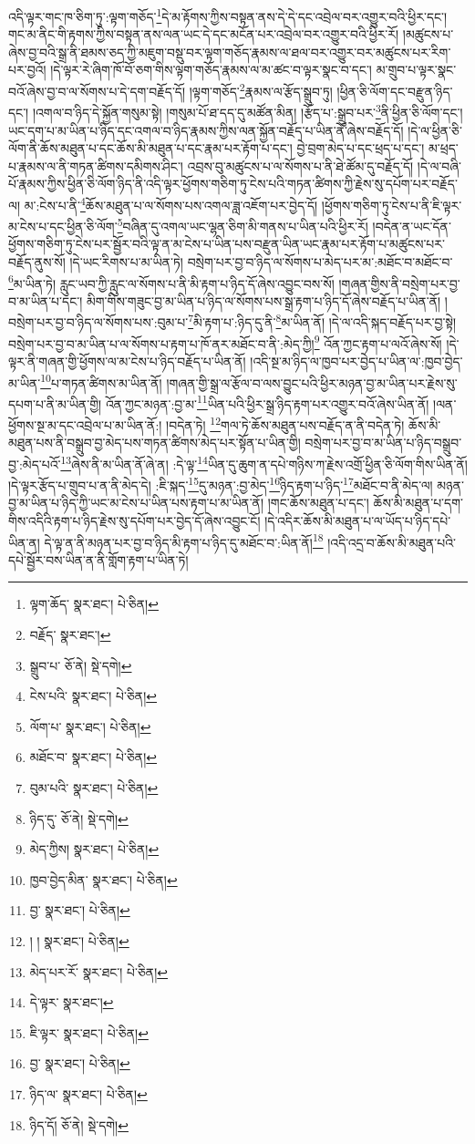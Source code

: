 འདི་ལྟར་གང་ཁ་ཅིག་ཏུ་:ལྟག་གཅོད་\footnote{ལྟག་ཆོད་  སྣར་ཐང་།  པེ་ཅིན། }དེ་མ་རྟོགས་ཀྱིས་བསྟན་ནས་དེ་དེ་དང་འབྲེལ་བར་འགྱུར་བའི་ཕྱིར་དང་། གང་མ་ནིང་གི་རྟགས་ཀྱིས་བསྟན་ནས་ལན་ཡང་དེ་དང་མངོན་པར་འབྲེལ་བར་འགྱུར་བའི་ཕྱིར་རོ། །མཚུངས་པ་ཞེས་བྱ་བའི་སྒྲ་ནི་ཐམས་ཅད་ཀྱི་མཇུག་བསྡུ་བར་ལྟག་གཅོད་རྣམས་ལ་ཐལ་བར་འགྱུར་བར་མཚུངས་པར་རིག་པར་བྱའོ། །དེ་ལྟར་རེ་ཞིག་ཁོ་བོ་ཅག་གིས་ལྟག་གཅོད་རྣམས་ལ་མ་ཚང་བ་ལྟར་སྣང་བ་དང་། མ་གྲུབ་པ་ལྟར་སྣང་བའོ་ཞེས་བྱ་བ་ལ་སོགས་པ་དེ་དག་བརྗོད་དོ། །ལྟག་གཅོད་\footnote{བརྗོད་  སྣར་ཐང་། }རྣམས་ལ་རྩོད་སྒྲུབ་ཏུ། །ཕྱིན་ཅི་ལོག་དང་བརྫུན་ཉིད་དང་། །འགལ་བ་ཉིད་དེ་སྐྱོན་གསུམ་སྟེ། །གསུམ་པོ་ཐ་དད་དུ་མཚོན་མིན། །རྩོད་པ་:སྒྲུབ་པར་\footnote{སྒྲུབ་པ་  ཅོ་ནེ།  སྡེ་དགེ། }ནི་ཕྱིན་ཅི་ལོག་དང་། ཡང་དག་པ་མ་ཡིན་པ་ཉིད་དང་འགལ་བ་ཉིད་རྣམས་ཀྱིས་ལན་སྐྱོན་བརྗོད་པ་ཡིན་ནོ་ཞེས་བརྗོད་དོ། །དེ་ལ་ཕྱིན་ཅི་ལོག་ནི་ཆོས་མཐུན་པ་དང་ཆོས་མི་མཐུན་པ་དང་རྣམ་པར་རྟོག་པ་དང་། བྱེ་བྲག་མེད་པ་དང་ཕྲད་པ་དང་། མ་ཕྲད་པ་རྣམས་ལ་ནི་གཏན་ཚིགས་དམིགས་ཤིང་། འབྲས་བུ་མཚུངས་པ་ལ་སོགས་པ་ནི་ཐེ་ཚོམ་དུ་བརྗོད་དོ། །དེ་ལ་བཞི་པོ་རྣམས་ཀྱིས་ཕྱིན་ཅི་ལོག་ཉིད་ནི་འདི་ལྟར་ཕྱོགས་གཅིག་ཏུ་ངེས་པའི་གཏན་ཚིགས་ཀྱི་རྗེས་སུ་དཔོག་པར་བརྗོད་ལ། མ་:ངེས་པ་ནི་\footnote{ངེས་པའི་  སྣར་ཐང་།  པེ་ཅིན། }ཆོས་མཐུན་པ་ལ་སོགས་པས་འགལ་ཟླ་འཇོག་པར་བྱེད་དོ། །ཕྱོགས་གཅིག་ཏུ་ངེས་པ་ནི་ཇི་ལྟར་མ་ངེས་པ་དང་ཕྱིན་ཅི་ལོག་\footnote{ལོག་པ་  སྣར་ཐང་།  པེ་ཅིན། }བཞིན་དུ་འགལ་ཡང་ལྷན་ཅིག་མི་གནས་པ་ཡིན་པའི་ཕྱིར་རོ། །བདེན་ན་ཡང་དོན་ཕྱོགས་གཅིག་ཏུ་ངེས་པར་སྦྱོར་བའི་ལྟ་ན་མ་ངེས་པ་ཡིན་པས་བརྫུན་ཡིན་ཡང་རྣམ་པར་རྟོག་པ་མཚུངས་པར་བརྗོད་ནུས་སོ། །དེ་ཡང་རིགས་པ་མ་ཡིན་ཏེ། བསྲེག་པར་བྱ་བ་ཉིད་ལ་སོགས་པ་མེད་པར་མ་:མཐོང་བ་མཐོང་བ་\footnote{མཐོང་བ་  སྣར་ཐང་།  པེ་ཅིན། }མ་ཡིན་ཏེ། རླུང་ཡབ་ཀྱི་རླུང་ལ་སོགས་པ་ནི་མི་རྟག་པ་ཉིད་དོ་ཞེས་འབྱུང་བས་སོ། །གཞན་གྱིས་ནི་བསྲེག་པར་བྱ་བ་མ་ཡིན་པ་དང་། མིག་གིས་གཟུང་བྱ་མ་ཡིན་པ་ཉིད་ལ་སོགས་པས་སྒྲ་རྟག་པ་ཉིད་དོ་ཞེས་བརྗོད་པ་ཡིན་ནོ། །བསྲེག་པར་བྱ་བ་ཉིད་ལ་སོགས་པས་:བུམ་པ་\footnote{བུམ་པའི་  སྣར་ཐང་།  པེ་ཅིན། }མི་རྟག་པ་:ཉིད་དུ་ནི་\footnote{ཉིད་དུ་  ཅོ་ནེ།  སྡེ་དགེ། }མ་ཡིན་ནོ། །དེ་ལ་འདི་སྐད་བརྗོད་པར་བྱ་སྟེ། བསྲེག་པར་བྱ་བ་མ་ཡིན་པ་ལ་སོགས་པ་རྟག་པ་ཁོ་ནར་མཐོང་བ་ནི་:མེད་ཀྱི།\footnote{མེད་ཀྱིས།  སྣར་ཐང་།  པེ་ཅིན། } འོན་ཀྱང་རྟག་པ་ལའོ་ཞེས་སོ། །དེ་ལྟར་ནི་གཞན་གྱི་ཕྱོགས་ལ་མ་ངེས་པ་ཉིད་བརྗོད་པ་ཡིན་ནོ། །འདི་སྔ་མ་ཉིད་ལ་ཁྱབ་པར་བྱེད་པ་ཡིན་ལ་:ཁྱབ་བྱེད་མ་ཡིན་\footnote{ཁྱབ་བྱེད་མིན་  སྣར་ཐང་།  པེ་ཅིན། }པ་གཏན་ཚིགས་མ་ཡིན་ནོ། །གཞན་གྱི་སྒྲ་ལ་རྩོལ་བ་ལས་བྱུང་པའི་ཕྱིར་མཉན་བྱ་མ་ཡིན་པར་རྗེས་སུ་དཔག་པ་ནི་མ་ཡིན་གྱི། འོན་ཀྱང་མཉན་:བྱ་མ་\footnote{བྱ་  སྣར་ཐང་།  པེ་ཅིན། }ཡིན་པའི་ཕྱིར་སྒྲ་ཉིད་རྟག་པར་འགྱུར་བའོ་ཞེས་ཡིན་ནོ། །ལན་ཕྱོགས་སྔ་མ་དང་འབྲེལ་པ་མ་ཡིན་ནོ:། །བདེན་ཏེ། \footnote{། །   སྣར་ཐང་།  པེ་ཅིན། }གལ་ཏེ་ཆོས་མཐུན་པས་བརྗོད་ན་ནི་བདེན་ཏེ། ཆོས་མི་མཐུན་པས་ནི་བསྒྲུབ་བྱ་མེད་པས་གཏན་ཚིགས་མེད་པར་སྟོན་པ་ཡིན་གྱི། བསྲེག་པར་བྱ་བ་མ་ཡིན་པ་ཉིད་བསྒྲུབ་བྱ་:མེད་པའོ་\footnote{མེད་པར་རོ་  སྣར་ཐང་།  པེ་ཅིན། }ཞེས་ནི་མ་ཡིན་ནོ་ཞེ་ན། :དེ་ལྟ་\footnote{དེ་ལྟར་  སྣར་ཐང་། }ཡིན་དུ་ཆུག་ན་དཔེ་གཉིས་ཀ་རྗེས་འགྲོ་ཕྱིན་ཅི་ལོག་གིས་ཡིན་ནོ། །དེ་ལྟར་རྩོད་པ་གྲུབ་པ་ན་ནི་མེད་དེ། :ཇི་སྐད་\footnote{ཇི་ལྟར་  སྣར་ཐང་།  པེ་ཅིན། }དུ་མཉན་:བྱ་མེད་\footnote{བྱ་  སྣར་ཐང་།  པེ་ཅིན། }ཉིད་རྟག་པ་ཉིད་\footnote{ཉིད་ལ་  སྣར་ཐང་།  པེ་ཅིན། }མཐོང་བ་ནི་མེད་ལ། མཉན་བྱ་མ་ཡིན་པ་ཉིད་ཀྱི་ཡང་མ་ངེས་པ་ཡིན་པས་རྟག་པ་མ་ཡིན་ནོ། །གང་ཆོས་མཐུན་པ་དང་། ཆོས་མི་མཐུན་པ་དག་གིས་འདིའི་རྟག་པ་ཉིད་རྗེས་སུ་དཔོག་པར་བྱེད་དོ་ཞེས་འབྱུང་ངོ། །དེ་འདིར་ཆོས་མི་མཐུན་པ་ལ་ཡོད་པ་ཉིད་དཔེ་ཡིན་ན། དེ་ལྟ་ན་ནི་མཉན་པར་བྱ་བ་ཉིད་མི་རྟག་པ་ཉིད་དུ་མཐོང་བ་:ཡིན་ནོ།\footnote{ཉིད་དོ།  ཅོ་ནེ།  སྡེ་དགེ། } །འདི་འདྲ་བ་ཆོས་མི་མཐུན་པའི་དཔེ་སྦྱོར་བས་ཡིན་ན་ནི་གློག་རྟག་པ་ཡིན་ཏེ། 